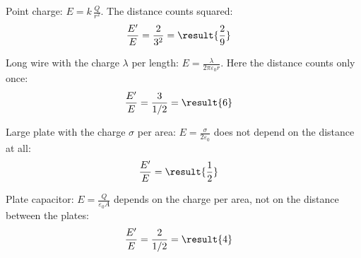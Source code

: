 \begin{abcliste}
\abc Point charge: $E = k\,\frac{Q}{r^2}$. The distance counts squared:
\begin{align}
 \frac{E'}{E} &= \frac{2}{3^2} = \result{\frac{2}{9}}
\end{align}

\abc Long wire with the charge $\lambda$ per length: $E = \frac{\lambda}{2\pi\varepsilon_0 r}$. Here the distance counts only once:
\begin{align}
 \frac{E'}{E} &= \frac{3}{1/2} = \result{6}
\end{align}

\abc Large plate with the charge $\sigma$ per area: $E = \frac{\sigma}{2\varepsilon_0}$ does not depend on the distance at all:
\begin{align}
 \frac{E'}{E} &= \result{\frac{1}{2}}
\end{align}

\abc Plate capacitor: $E = \frac{Q}{\varepsilon_0 A}$ depends on the charge per area, not on the distance between the plates:
\begin{align}
 \frac{E'}{E} &= \frac{2}{1/2} = \result{4}
\end{align}
\end{abcliste}
